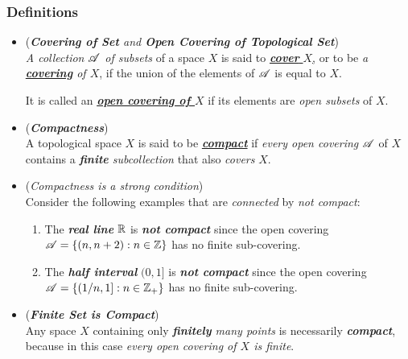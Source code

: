 \documentclass[11pt]{article}
\begin{document}
\subsubsection{Definitions}
\begin{itemize}
\item \begin{definition} (\emph{\textbf{Covering of Set} and \textbf{Open Covering of Topological Set}})\\
\emph{A collection ${\mathscr A}$ of subsets} of a space $X$ is said to \underline{\emph{\textbf{cover}} $X$,} or to be \emph{a \underline{\textbf{covering}} of $X$}, if the union of the elements of ${\mathscr A}$ is equal to $X$. 

It is called an \underline{\emph{\textbf{open covering of $X$}}} if its elements are \emph{open subsets} of $X$.
\end{definition}

\item \begin{definition} (\emph{\textbf{Compactness}})\\
A topological space $X$ is said to be \underline{\emph{\textbf{compact}}} if \emph{every open covering} ${\mathscr A}$ of $X$ contains a \emph{\textbf{finite} subcollection} that also \emph{covers} $X$.
\end{definition}


\item \begin{example}(\emph{Compactness is a strong condition})\\
Consider the following examples that are \emph{connected} by \emph{not compact}:
\begin{enumerate}
\item The \emph{\textbf{real line}} ${\mathbb R}$ is \textit{\textbf{not compact}} since the open covering ${\mathscr A} = \left\{(n, n+2): n \in {\mathbb Z}\right\}$ has no finite sub-covering.
\item The \emph{\textbf{half interval}} $(0, 1]$ is \emph{\textbf{not compact}} since the open covering ${\mathscr A} = \left\{(1/n, 1]: n \in {\mathbb Z}_{+}\right\}$ has no finite sub-covering.
\end{enumerate}
\end{example}

\item \begin{example}(\emph{\textbf{Finite Set is Compact}})\\
Any space $X$ containing only \emph{\textbf{finitely} many points} is necessarily \emph{\textbf{compact}}, because in this case \emph{every open covering of $X$ is finite}.
\end{example}


\end{itemize}
\end{document}
